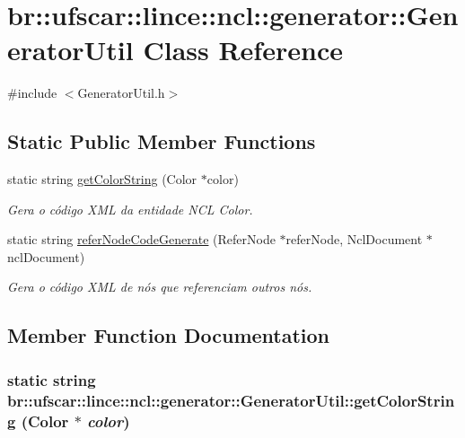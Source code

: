 \hypertarget{classbr_1_1ufscar_1_1lince_1_1ncl_1_1generator_1_1GeneratorUtil}{
\section{br::ufscar::lince::ncl::generator::GeneratorUtil Class Reference}
\label{classbr_1_1ufscar_1_1lince_1_1ncl_1_1generator_1_1GeneratorUtil}
}


{\ttfamily \#include $<$GeneratorUtil.h$>$}

\subsection*{Static Public Member Functions}
\begin{DoxyCompactItemize}
\item 
static string \hyperlink{classbr_1_1ufscar_1_1lince_1_1ncl_1_1generator_1_1GeneratorUtil_ab101a0c4ce5682c23d5ba1fb1d307bc6}{getColorString} (Color $\ast$color)
\begin{DoxyCompactList}\small\item\em Gera o código XML da entidade NCL Color. \item\end{DoxyCompactList}\item 
static string \hyperlink{classbr_1_1ufscar_1_1lince_1_1ncl_1_1generator_1_1GeneratorUtil_a7e02b3e55b58c419f56c86fa4d431265}{referNodeCodeGenerate} (ReferNode $\ast$referNode, NclDocument $\ast$nclDocument)
\begin{DoxyCompactList}\small\item\em Gera o código XML de nós que referenciam outros nós. \item\end{DoxyCompactList}\end{DoxyCompactItemize}


\subsection{Member Function Documentation}
\hypertarget{classbr_1_1ufscar_1_1lince_1_1ncl_1_1generator_1_1GeneratorUtil_ab101a0c4ce5682c23d5ba1fb1d307bc6}{
\subsubsection[{getColorString}]{\setlength{\rightskip}{0pt plus 5cm}static string br::ufscar::lince::ncl::generator::GeneratorUtil::getColorString (Color $\ast$ {\em color})}}
\label{classbr_1_1ufscar_1_1lince_1_1ncl_1_1generator_1_1GeneratorUtil_ab101a0c4ce5682c23d5ba1fb1d307bc6}


